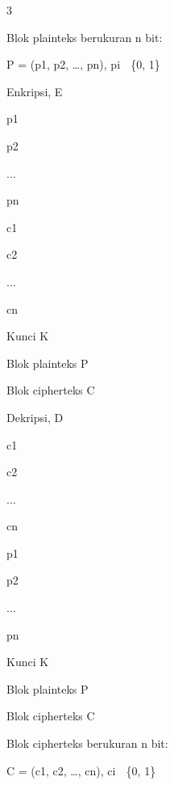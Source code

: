 \documentclass{article}
\begin{document}

3

Blok plainteks berukuran n bit:

 P = (p1, p2, …, pn), pi  \{0, 1\} 

Enkripsi, E

p1

p2

...

pn

c1

c2

...

cn

Kunci K

Blok plainteks P

Blok cipherteks C

Dekripsi, D

c1

c2

...

cn

p1

p2

...

pn

Kunci K

Blok plainteks P

Blok cipherteks C

Blok cipherteks berukuran n bit:

 C = (c1, c2, …, cn), ci  \{0, 1\}
\end{document}
